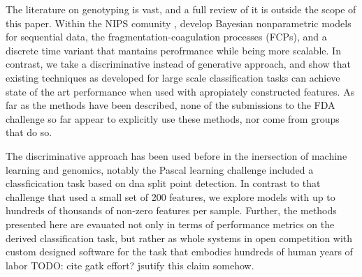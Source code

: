 \documentclass{article}
\begin{document}
The literature on genotyping is vast, and a full review of it is outside the scope of this paper.
Within the NIPS comunity \cite{teh2011modelling}, develop Bayesian nonparametric models for sequential data, the fragmentation-coagulation processes (FCPs), and a discrete time variant that mantains perofrmance while being more scalable. \cite{elliott2012scalable}
In contrast, we take a discriminative instead of generative approach, and show that existing techniques as developed for large scale classification tasks can achieve state of the art performance when used with apropiately constructed features. 
As far as the methods have been described, none of the submissions to the FDA challenge so far appear to explicitly use these methods, nor come from groups that do so.

The discriminative approach has been used before in the inersection of machine learning and genomics, notably the Pascal learning challenge included a classficication task based on dna split point detection.
In contrast to that challenge that used a small set of 200 features, we explore models with up to hundreds of thousands of non-zero features per sample.
Further, the methods presented here are evauated not only in terms of performance metrics on the derived classification task, but rather as whole systems in open competition with custom designed software for the task that embodies hundreds of human years of labor TODO: cite gatk effort? jsutify this claim somehow.
\end{document}

